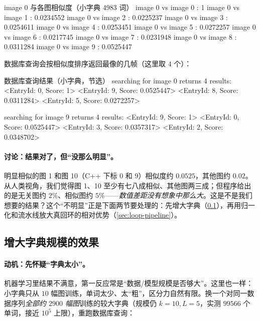 \begin{codebox}[text]{image 0 与各图相似度（小字典 4983 词）}
image 0 vs image 0 : 1
image 0 vs image 1 : 0.0234552
image 0 vs image 2 : 0.0225237
image 0 vs image 3 : 0.0254611
image 0 vs image 4 : 0.0253451
image 0 vs image 5 : 0.0272257
image 0 vs image 6 : 0.0217745
image 0 vs image 7 : 0.0231948
image 0 vs image 8 : 0.0311284
image 0 vs image 9 : 0.0525447
\end{codebox}

\noindent 数据库查询会按相似度排序返回最像的几帧（这里取 $4$ 个）：

\begin{codebox}[text]{数据库查询结果（小字典，节选）}
searching for image 0 returns 4 results:
<EntryId: 0, Score: 1>
<EntryId: 9, Score: 0.0525447>
<EntryId: 8, Score: 0.0311284>
<EntryId: 5, Score: 0.0272257>

searching for image 9 returns 4 results:
<EntryId: 9, Score: 1>
<EntryId: 0, Score: 0.0525447>
<EntryId: 3, Score: 0.0357317>
<EntryId: 2, Score: 0.0348702>
\end{codebox}

\paragraph{讨论：结果对了，但“没那么明显”。}
明显相似的图 1 和图 10（C++ 下标 $0$ 和 $9$）相似度约 $0.0525$，其他图约 $0.02$\cite{gaoxiang2019slam14}。从人类视角，我们觉得图 1、10 至少有七八成相似、其他图两三成；但程序给出的是无关图约 $2\%$、相似图约 $5\%$——\emph{数值差距没有想象中那么大}。这是不是我们想要的结果？这个“不明显”正是下面两节要处理的：先增大字典（\cref{sec:loop-score-bigdict}），再用归一化和流水线放大真回环的相对优势（\cref{sec:loop-pipeline}）。

\subsection{增大字典规模的效果}
\label{sec:loop-score-bigdict}

\paragraph{动机：先怀疑“字典太小”。}
机器学习里结果不满意，第一反应常是“数据/模型规模是否够大”\cite{gaoxiang2019slam14}。这里也一样：小字典只从 $10$ 幅图训练，单词太少、太“粗”，区分力自然有限。换一个对同一数据序列\emph{全部约 $2900$ 幅图}训练的较大字典（规模仍 $k=10,L=5$，实测 $99566$ 个单词，接近 $10^5$ 上限），重跑数据库查询：

